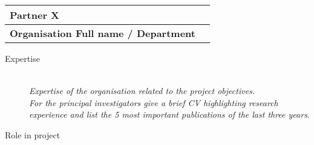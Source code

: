 %

\begin{center}
    \begin{tabular}{|p{}|l|}
        \hline
        \textbf{Partner X} & \\\hline
        \textbf{Organisation Full name / Department} &  \\
        \hline
    \end{tabular}    
\end{center}

\begin{description}
  \item[Expertise]~\\
    \emph{Expertise of the organisation related to the project objectives.}\\
    \emph{For the principal investigators give a brief CV highlighting research
      experience and list the 5 most important publications of the last three
      years}. 
    
    
    
  \item[Role in project]~\\

\end{description}


%
